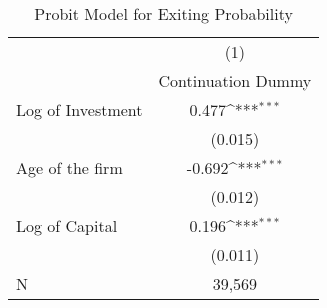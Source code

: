 \begin{table}[htbp]\centering
\def\sym#1{\ifmmode^{#1}\else\(^{#1}\)\fi}
\caption{Probit Model for Exiting Probability \label{tab:q4b1}}
\begin{tabular}{l*{1}{c}}
\toprule
                    &\multicolumn{1}{c}{(1)}\\
                    &\multicolumn{1}{c}{Continuation Dummy}\\
\midrule
Log of Investment   &       0.477\sym{***}\\
                    &     (0.015)         \\
\addlinespace
Age of the firm     &      -0.692\sym{***}\\
                    &     (0.012)         \\
\addlinespace
Log of Capital      &       0.196\sym{***}\\
                    &     (0.011)         \\
\midrule
N                   &      39,569         \\
\bottomrule
\end{tabular}
\end{table}

